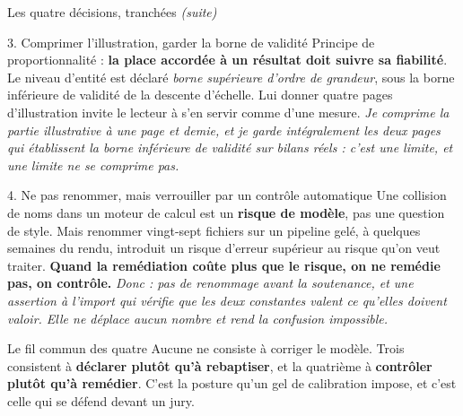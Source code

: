 \documentclass[11pt]{beamer}
\begin{document}
\begin{frame}{Les quatre décisions, tranchées \emph{(suite)}}
\scriptsize
\begin{block}{3. Comprimer l'illustration, garder la borne de validité}
Principe de proportionnalité : \textbf{la place accordée à un résultat doit suivre sa
fiabilité}. Le niveau d'entité est déclaré \emph{borne supérieure d'ordre de grandeur}, sous la
borne inférieure de validité de la descente d'échelle. Lui donner quatre pages d'illustration
invite le lecteur à s'en servir comme d'une mesure. \emph{Je comprime la partie illustrative à
une page et demie, et je garde intégralement les deux pages qui établissent la borne inférieure
de validité sur bilans réels : c'est une limite, et une limite ne se comprime pas.}
\end{block}
\vspace{-1.5mm}
\begin{block}{4. Ne pas renommer, mais verrouiller par un contrôle automatique}
Une collision de noms dans un moteur de calcul est un \textbf{risque de modèle}, pas une
question de style. Mais renommer vingt-sept fichiers sur un pipeline gelé, à quelques semaines
du rendu, introduit un risque d'erreur supérieur au risque qu'on veut traiter. \textbf{Quand la
remédiation coûte plus que le risque, on ne remédie pas, on contrôle.} \emph{Donc : pas de
renommage avant la soutenance, et une assertion à l'import qui vérifie que les deux constantes
valent ce qu'elles doivent valoir. Elle ne déplace aucun nombre et rend la confusion
impossible.}
\end{block}
\vspace{-1.5mm}
\begin{block}{Le fil commun des quatre}
Aucune ne consiste à corriger le modèle. Trois consistent à \textbf{déclarer plutôt qu'à
rebaptiser}, et la quatrième à \textbf{contrôler plutôt qu'à remédier}. C'est la posture qu'un
gel de calibration impose, et c'est celle qui se défend devant un jury.
\end{block}
\end{frame}
\end{document}
